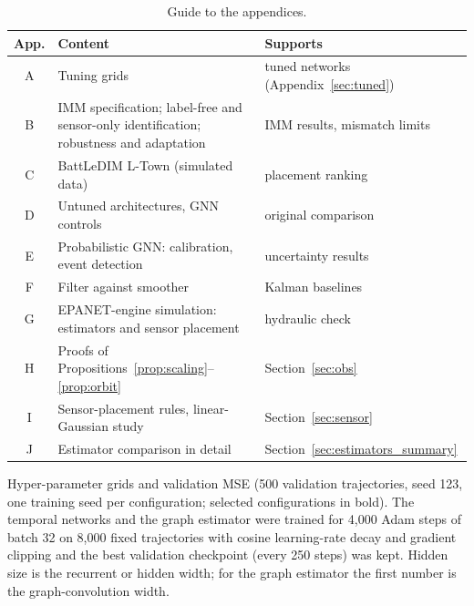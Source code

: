 \documentclass[conference]{IEEEtran}
\begin{document}
\begin{table}[t]
\centering
\caption{Guide to the appendices.}
\label{tab:appendix_guide}
\small
\setlength{\tabcolsep}{4pt}
\begin{tabular}{@{}c>{\raggedright\arraybackslash}p{3.7cm}>{\raggedright\arraybackslash}p{2.8cm}@{}}
\toprule
App. & Content & Supports \\
\midrule
A & Tuning grids & tuned networks (Appendix~\ref{sec:tuned}) \\
B & IMM specification; label-free and sensor-only identification; robustness and adaptation & IMM results, mismatch limits \\
C & BattLeDIM L-Town (simulated data) & placement ranking \\
D & Untuned architectures, GNN controls & original comparison \\
E & Probabilistic GNN: calibration, event detection & uncertainty results \\
F & Filter against smoother & Kalman baselines \\
G & EPANET-engine simulation: estimators and sensor placement & hydraulic check \\
H & Proofs of Propositions~\ref{prop:scaling}--\ref{prop:orbit} & Section~\ref{sec:obs} \\
I & Sensor-placement rules, linear-Gaussian study & Section~\ref{sec:sensor} \\
J & Estimator comparison in detail & Section~\ref{sec:estimators_summary} \\
\bottomrule
\end{tabular}
\end{table}
Hyper-parameter grids and validation MSE (500 validation trajectories, seed 123, one training seed per configuration; selected configurations in bold). The temporal networks and the graph estimator were trained for 4,000 Adam steps of batch 32 on 8,000 fixed trajectories with cosine learning-rate decay and gradient clipping and the best validation checkpoint (every 250 steps) was kept. Hidden size is the recurrent or hidden width; for the graph estimator the first number is the graph-convolution width.
\end{document}
